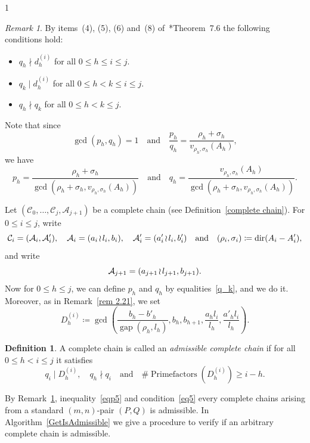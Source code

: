 \documentclass[reqno,a4paper,twoside]{amsart}
\theoremstyle{definition}
\newtheorem{definition}[theorem]{Definition}
\theoremstyle{remark}
\newtheorem{remark}[theorem]{Remark}
\DeclareMathOperator{\gap}{gap}
\DeclareMathOperator{\dir}{dir}
\newcommand{\wrs}{\hspace{-0.9pt}\wr\hspace{-0.9pt}}
\DeclareMathOperator{\Primefactors}{Prime factors}
\begin{document}
\begin{spacing}{1}
\begin{remark}\label{admis}
By items~(4), (5), (6) and~(8) of~\cite{GGV1}*{Theorem~7.6} the following conditions hold:

\begin{itemize}[itemsep=0.5ex,topsep=0.5ex]

\item[-] $q_h\nmid d_h^{(i)}$ for all $0\le h\le i\le  j$.

\item[-] $q_k \mid d_h^{(i)}$ for all $0\le h< k\le i\le  j$.

\item[-] $q_h\nmid q_k$ for all $0\le h<k\le  j$.

\end{itemize}
Note that since
$$
\gcd(p_h,q_h) = 1\quad\text{and}\quad \frac{p_h}{q_h}=\frac{\rho_h+\sigma_h}{v_{\rho_h,\sigma_h}(A_h)},
$$
we have
\begin{equation}\label{q_k}
p_h=\frac{\rho_h + \sigma_h}{\gcd(\rho_h+\sigma_h,v_{\rho_h,\sigma_h}(A_h))} \quad\text{and}\quad q_h=\frac{v_{\rho_h,\sigma_h}(A_h)}{\gcd(\rho_h+\sigma_h,v_{\rho_h,\sigma_h}(A_h))}.
\end{equation}
\end{remark}

Let $(\mathcal{C}_0,\dots,\mathcal{C}_j,\mathcal{A}_{j+1})$ be a complete chain (see Definition~\ref{complete chain}). For $0\le i\le j$, write
$$
\mathcal{C}_i = (\mathcal{A}_i,\mathcal{A}'_i),\quad \mathcal{A}_i = (a_i\wrs l_i,b_i),\quad \mathcal{A}'_i = (a'_i\wrs l_i,b'_i) \quad\text{and}\quad (\rho_i,\sigma_i)\coloneqq \dir(A_i-A'_i),
$$
and write
$$
\mathcal{A}_{j+1} = (a_{j+1}\wrs l_{j+1},b_{j+1}).
$$
Now for $0\le h\le j$, we can define $p_h$ and $q_h$ by equalities~\eqref{q_k}, and we do it. Moreover, as in Remark~\ref{rem 2.21}, we set
$$
D_h^{(i)}\coloneqq \gcd\left(\frac{b_h-b'_h}{\gap(\rho_h,l_h)},b_h,b_{h+1},\frac{a_h l_i}{l_h},\frac{a'_h l_i}{l_h}\right).
$$

\begin{definition}\label{cond div}
A complete chain is called an {\em admissible complete chain} if for all $0\le h<i\le  j$ it satisfies
$$
q_i \mid D_h^{(i)},\quad q_h\nmid q_i\quad\text{and}\quad \# \Primefactors (D_h^{(i)})\ge i-h.
$$
\end{definition}

By Remark~\ref{admis}, inequality~\eqref{eqp5} and condition~\eqref{eq5} every complete chains arising from a standard $(m,n)$-pair $(P,Q)$ is admissible. In Algorithm~\ref{GetIsAdmissible} we give a procedure to verify if an arbitrary complete chain is admissible.


\end{spacing}
\end{document}
